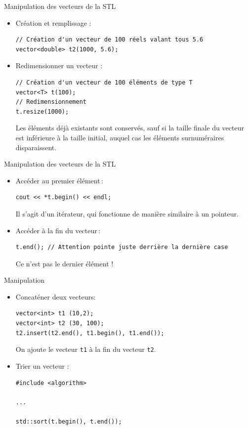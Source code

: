\begin{frame}[fragile]{Manipulation des vecteurs de la STL}
    \begin{itemize}
    \item Création et remplissage :
        \begin{verbatim}
// Création d'un vecteur de 100 réels valant tous 5.6
vector<double> t2(1000, 5.6);
        \end{verbatim}
    \item Redimensionner un vecteur :
    
        \begin{verbatim}
// Création d'un vecteur de 100 éléments de type T
vector<T> t(100);
// Redimensionnement
t.resize(1000);
        \end{verbatim}
    
    Les éléments déjà existants sont conservés, sauf si la taille finale du vecteur est inférieure à la taille initial, auquel cas les éléments surnuméraires disparaissent.    
    \end{itemize}
\end{frame}

\begin{frame}[fragile]{Manipulation des vecteurs de la STL}
    \begin{itemize}
    \item Accéder au premier élément\,:
    
        \begin{verbatim}
cout << *t.begin() << endl;
        \end{verbatim}
    
    Il s'agit d'un itérateur, qui fonctionne de manière similaire à un pointeur.
    \item Accéder à la fin du vecteur\,:
    
        \begin{verbatim}
t.end(); // Attention pointe juste derrière la dernière case
        \end{verbatim}
    \alert{Ce n'est pas le dernier élément !}
    \end{itemize}
\end{frame}

\begin{frame}[fragile]{Manipulation}
    \begin{itemize}
    \item Concaténer deux vecteurs:
    
        \begin{verbatim}
vector<int> t1 (10,2);
vector<int> t2 (30, 100);
t2.insert(t2.end(), t1.begin(), t1.end());
        \end{verbatim}
    
  	On ajoute le vecteur \texttt{t1} à la fin du vecteur \texttt{t2}.
    \item Trier un vecteur :
    
        \begin{verbatim}
#include <algorithm>

...

std::sort(t.begin(), t.end());
        \end{verbatim}
    \end{itemize}
\end{frame}

